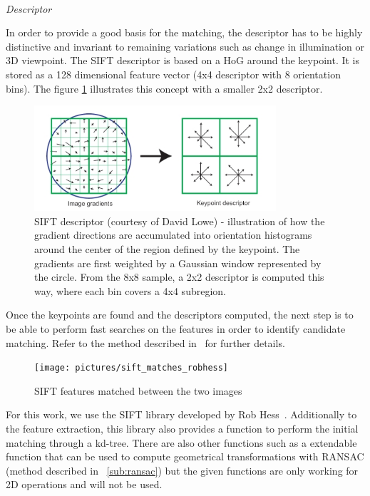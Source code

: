 \paragraph{}
\emph{Descriptor}

In order to provide a good basis for the matching, the descriptor has to be highly distinctive and invariant to remaining variations such as change in illumination or 3D viewpoint. The \gls{SIFT} descriptor is based on a \gls{HoG} around the keypoint. It is stored as a 128 dimensional feature vector (4x4 descriptor with 8 orientation bins). The figure \ref{fig:sift_descriptor} illustrates this concept with a smaller 2x2 descriptor.

\begin{figure}[h]
\centering
\includegraphics[width=0.8\textwidth]{figures/sift_descriptor}
\caption{SIFT descriptor (courtesy of David Lowe) - illustration of how the gradient directions are accumulated into orientation histograms around the center of the region defined by the keypoint. The gradients are first weighted by a Gaussian window represented by the circle. From the 8x8 sample, a 2x2 descriptor is computed this way, where each bin covers a 4x4 subregion.}
\label{fig:sift_descriptor}
\end{figure}

Once the keypoints are found and the descriptors computed, the next step is to be able to perform fast searches on the features in order to identify candidate matching. Refer to the method described in~\cite{lowe_2004_sift} for further details.

\begin{figure}[h]
\centering
\texttt{[image: pictures/sift\_matches\_robhess]}
\caption{SIFT features matched between the two images}
\end{figure}

For this work, we use the \gls{SIFT} library developed by Rob Hess~\cite{hess_sift}. Additionally to the feature extraction, this library also provides a function to perform the initial matching through a kd-tree. There are also other functions such as a extendable function that can be used to compute geometrical transformations with \gls{RANSAC} (method described in ~\ref{sub:ransac}) but the given functions are only working for 2D operations and will not be used.

